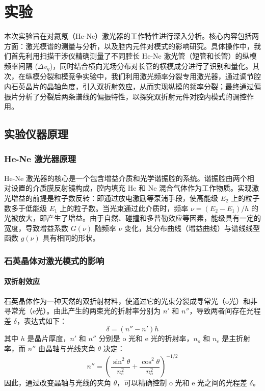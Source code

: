 \documentclass[a4paper, 1.5lines]{ctexart}
\begin{document}
    \section{实验}
        本次实验旨在对氦氖（He-Ne）激光器的工作特性进行深入分析。核心内容包括两方面：激光模谱的测量与分析，以及腔内元件对模式的影响研究。具体操作中，我们首先利用扫描干涉仪精确测量了不同腔长 He-Ne 激光管（短管和长管）的纵模频率间隔 ($\Delta v_q$)，同时结合横向光场分布对长管的横模成分进行了识别和量化。其次，在纵模分裂和模竞争实验中，我们利用激光频率分裂专用激光器，通过调节腔内石英晶片的晶轴角度，引入双折射效应，从而实现纵模的频率分裂；最终通过偏振片分析了分裂后两条谱线的偏振特性，以探究双折射元件对腔内模式的调控作用。

\subsection{实验仪器原理}

\subsubsection{He-Ne 激光器原理}
He-Ne 激光器的核心是一个包含增益介质和光学谐振腔的系统。谐振腔由两个相对设置的介质膜反射镜构成，腔内填充 He 和 Ne 混合气体作为工作物质。实现激光增益的前提是粒子数反转：即通过放电激励等泵浦手段，使高能级 $E_2$ 上的粒子数多于低能级 $E_1$ 上的粒子数。当光束通过此介质时，频率 $\nu = (E_2 - E_1)/h$ 的光被放大，即产生了增益。由于自然、碰撞和多普勒效应等因素，能级具有一定的宽度，导致增益系数 $G(\nu)$ 随频率 $\nu$ 变化，其分布曲线（增益曲线）与谱线线型函数 $g(\nu)$ 具有相同的形状。

\subsubsection{石英晶体对激光模式的影响}

\paragraph{双折射效应}
石英晶体作为一种天然的双折射材料，使通过它的光束分裂成寻常光（o光）和非寻常光（e光）。由此产生的两束光的折射率分别为 $n'$ 和 $n''$，导致两者间存在光程差 $\delta$，表达式如下：
$$
\delta = ( n'' - n' )h
$$
其中 $h$ 是晶片厚度，$n'$ 和 $n''$ 分别是 o 光和 e 光的折射率，$n_o$ 和 $n_e$ 是主折射率，而 $n''$ 由晶轴与光线夹角 $\theta$ 决定：
$$
n'' = \left(\dfrac{\sin^2\theta}{n_e^2} + \dfrac{\cos^2\theta}{n_o^2}\right)^{-1/2}
$$
因此，通过改变晶轴与光线的夹角 $\theta$，可以精确控制 o 光和 e 光之间的光程差 $\delta$。
\end{document}
